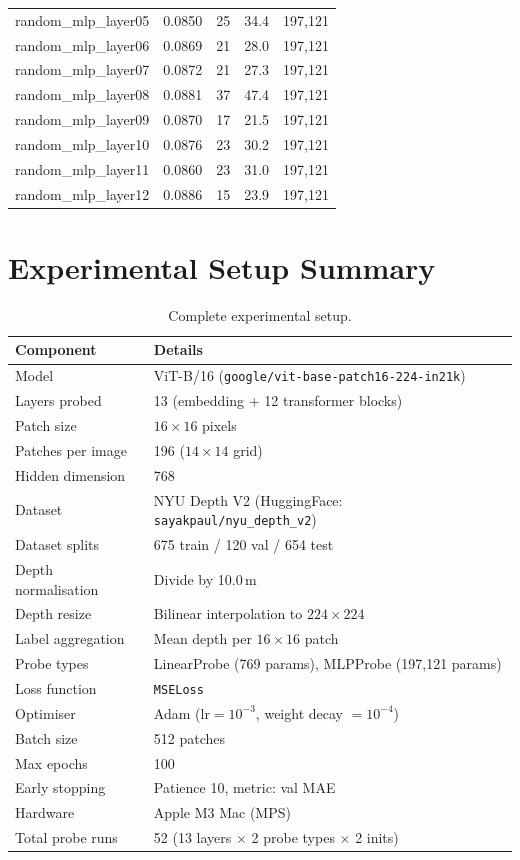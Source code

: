 \documentclass[11pt,a4paper]{article}
\begin{document}
\begin{table}[H]
\begin{tabular}{lrrrr}
random\_mlp\_layer05 & 0.0850 & 25 & 34.4 & 197,121 \\
random\_mlp\_layer06 & 0.0869 & 21 & 28.0 & 197,121 \\
random\_mlp\_layer07 & 0.0872 & 21 & 27.3 & 197,121 \\
random\_mlp\_layer08 & 0.0881 & 37 & 47.4 & 197,121 \\
random\_mlp\_layer09 & 0.0870 & 17 & 21.5 & 197,121 \\
random\_mlp\_layer10 & 0.0876 & 23 & 30.2 & 197,121 \\
random\_mlp\_layer11 & 0.0860 & 23 & 31.0 & 197,121 \\
random\_mlp\_layer12 & 0.0886 & 15 & 23.9 & 197,121 \\
\bottomrule
\end{tabular}
\end{table}

\section{Experimental Setup Summary}

\begin{table}[H]
\centering
\caption{Complete experimental setup.}
\begin{tabular}{ll}
\toprule
Component & Details \\
\midrule
Model & ViT-B/16 (\texttt{google/vit-base-patch16-224-in21k}) \\
Layers probed & 13 (embedding + 12 transformer blocks) \\
Patch size & $16\times16$ pixels \\
Patches per image & 196 ($14\times14$ grid) \\
Hidden dimension & 768 \\
Dataset & NYU Depth V2 (HuggingFace: \texttt{sayakpaul/nyu\_depth\_v2}) \\
Dataset splits & 675 train / 120 val / 654 test \\
Depth normalisation & Divide by 10.0\,m \\
Depth resize & Bilinear interpolation to $224\!\times\!224$ \\
Label aggregation & Mean depth per $16\times16$ patch \\
Probe types & LinearProbe (769 params), MLPProbe (197,121 params) \\
Loss function & \texttt{MSELoss} \\
Optimiser & Adam ($\text{lr}=10^{-3}$, weight decay $= 10^{-4}$) \\
Batch size & 512 patches \\
Max epochs & 100 \\
Early stopping & Patience 10, metric: val MAE \\
Hardware & Apple M3 Mac (MPS) \\
Total probe runs & 52 (13 layers $\times$ 2 probe types $\times$ 2 inits) \\
\bottomrule
\end{tabular}
\end{table}
\end{document}
